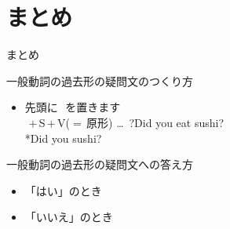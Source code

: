 \documentclass[aspectratio=169,xcolor={dvipsnames,table}]{beamer}
\begin{document}
\section{まとめ}
\begin{frame}[plain]{まとめ}
 

\begin{exampleblock}{一般動詞の過去形の疑問文のつくり方}\small
\begin{itemize}[square]
 \item   先頭に\,\,\,\,を置きます\\[10pt]
	 \,\,$+$\,S\,$+$\,V{\scriptsize ($=$\,原形)} \ldots\,\,\,?\hfill{}Did you eat sushi?\\
\hfill{}*Did you  sushi?
\end{itemize}
     \end{exampleblock}

\pause

\begin{exampleblock}{一般動詞の過去形の疑問文への答え方}
\small
\begin{itemize}[square]
 \item 「はい」のとき\hfill{}\hspace{120pt}\mbox{}
 \item 「いいえ」のとき\hfill{}\hspace{120pt}\mbox{}
\end{itemize}

      \end{exampleblock}
\end{frame}
\end{document}
